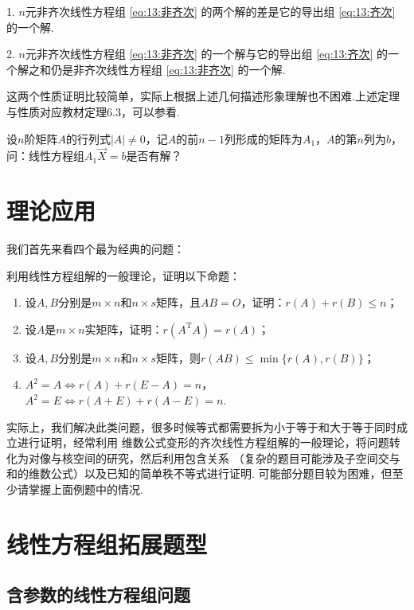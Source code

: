 1. $n$元非齐次线性方程组 \ref*{eq:13:非齐次} 的两个解的差是它的导出组 \ref*{eq:13:齐次} 的一个解.

2. $n$元非齐次线性方程组 \ref*{eq:13:非齐次} 的一个解与它的导出组 \ref*{eq:13:齐次} 的一个解之和仍是非齐次线性方程组 \ref*{eq:13:非齐次} 的一个解.

这两个性质证明比较简单，实际上根据上述几何描述形象理解也不困难.上述定理与性质对应教材定理6.3，可以参看.
\begin{example}
    设$n$阶矩阵$A$的行列式$|A|\neq 0$，记$A$的前$n-1$列形成的矩阵为$A_1$，$A$的第$n$列为$b$，
    问：线性方程组$A_1\vec{X}=b$是否有解？
\end{example}

\section{理论应用}
我们首先来看四个最为经典的问题：
\begin{example}
    利用线性方程组解的一般理论，证明以下命题：
    \begin{enumerate}
        \item 设$A,B$分别是$m \times n$和$n \times s$矩阵，且$AB=O$，证明：$r(A)+r(B)\leqslant n$；

        \item 设$A$是$m \times n$实矩阵，证明：$r(A^\mathrm{T}A)=r(A)$；

        \item 设$A,B$分别是$m \times n$和$n \times s$矩阵，则$r(AB)\leqslant\min\{r(A),r(B)\}$；

        \item $A^2=A \iff r(A)+r(E-A)=n$，$A^2=E \iff r(A+E)+r(A-E)=n$.
    \end{enumerate}
\end{example}
实际上，我们解决此类问题，很多时候等式都需要拆为小于等于和大于等于同时成立进行证明，经常利用
维数公式变形的齐次线性方程组解的一般理论，将问题转化为对像与核空间的研究，然后利用包含关系
（复杂的题目可能涉及子空间交与和的维数公式）以及已知的简单秩不等式进行证明.
可能部分题目较为困难，但至少请掌握上面例题中的情况.

\section{线性方程组拓展题型}
\subsection{含参数的线性方程组问题}

